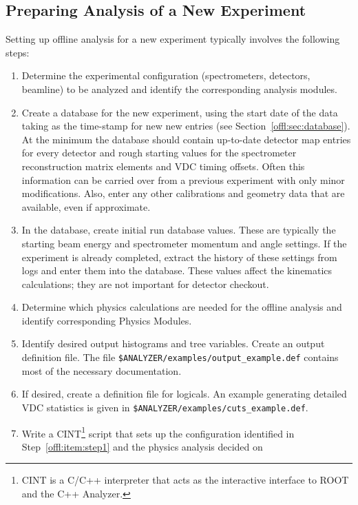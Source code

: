 {\subsection{Preparing Analysis of a New Experiment}
\label{offl:sec:newexpt}
Setting up offline analysis for a new experiment typically 
involves the following steps:
\begin{enumerate}
  \item Determine the experimental configuration (spectrometers,
        detectors, beamline) to be analyzed and identify the corresponding 
	analysis modules. \label{offl:item:step1}
  \item Create a database for the new experiment, using the
        start date of the data taking as the time-stamp for new
	new entries (see Section~\ref{offl:sec:database}).
	At the minimum the database should contain up-to-date
	detector map entries for every detector and rough starting
	values for the spectrometer reconstruction matrix elements
	and VDC timing offsets. Often this information can be
	carried over from a previous experiment with only minor
	modifications. Also, enter any other calibrations and geometry
	data that are available, even if approximate.
  \item In the database, create initial run database values.
        These are typically the starting beam energy and spectrometer
	momentum and angle settings. If the experiment is already completed,
	extract the history of these settings from logs and enter them
	into the database. These values affect the kinematics calculations;
	they are not important for detector checkout.
  \item Determine which physics calculations are needed for the
        offline analysis and identify corresponding Physics Modules.
	\label{offl:item:step3}
  \item Identify desired output histograms and tree variables.
        Create an output definition file. The file 
        {\tt \$ANALYZER/examples/output\_example.def} contains
	most of the necessary documentation.
  \item If desired, create a definition file for logicals.
        An example generating detailed VDC statistics is
	given in {\tt \$ANALYZER/examples/cuts\_example.def}.
  \item Write a CINT\footnote{CINT is a C/C++ interpreter that acts
        as the interactive interface to ROOT and the C++ Analyzer.}
        script that sets up the configuration identified in 
	Step~\ref{offl:item:step1} and the physics analysis decided on

\end{enumerate}}
